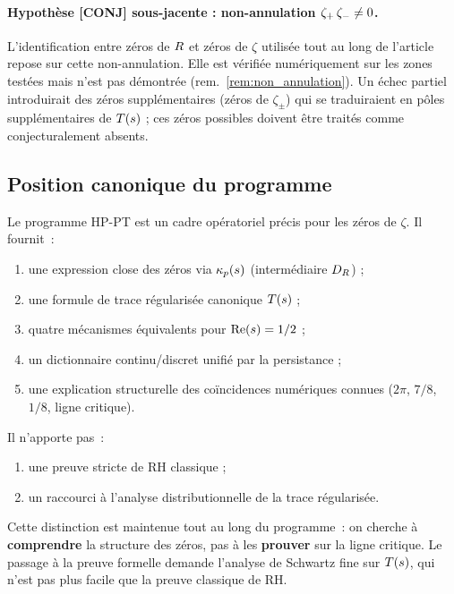 \paragraph{Hypothèse \textbf{[CONJ]} sous-jacente : non-annulation $\zeta_{+}\,\zeta_{-} \ne 0$.}
L'identification entre zéros de $R$ et zéros de $\zeta$ utilisée
tout au long de l'article repose sur cette non-annulation. Elle est
vérifiée numériquement sur les zones testées mais n'est pas démontrée
(rem.~\ref{rem:non_annulation}). Un échec partiel introduirait des zéros
supplémentaires (zéros de $\zeta_\pm$) qui se traduiraient en pôles
supplémentaires de $T(s)$ ; ces zéros possibles doivent être
traités comme conjecturalement absents.

\subsection{Position canonique du programme}
\label{sec:position_canonique}

Le programme HP-PT est un cadre opératoriel précis pour les zéros de
$\zeta$. Il fournit~:
\begin{enumerate}[nosep,leftmargin=*]
\item une expression close des zéros via $\kappa_p(s)$ (intermédiaire
$D_R$) ;
\item une formule de trace régularisée canonique $T(s)$ ;
\item quatre mécanismes équivalents pour $\operatorname{Re}(s) = 1/2$ ;
\item un dictionnaire continu/discret unifié par la persistance ;
\item une explication structurelle des coïncidences numériques connues
($2\pi$, $7/8$, $1/8$, ligne critique).
\end{enumerate}

Il n'apporte pas~:
\begin{enumerate}[nosep,leftmargin=*]
\item une preuve stricte de RH classique ;
\item un raccourci à l'analyse distributionnelle de la trace
régularisée.
\end{enumerate}

Cette distinction est maintenue tout au long du programme~: on cherche à
\textbf{comprendre} la structure des zéros, pas à les \textbf{prouver}
sur la ligne critique. Le passage à la preuve formelle demande
l'analyse de Schwartz fine sur $T(s)$, qui n'est pas plus facile que
la preuve classique de RH.

